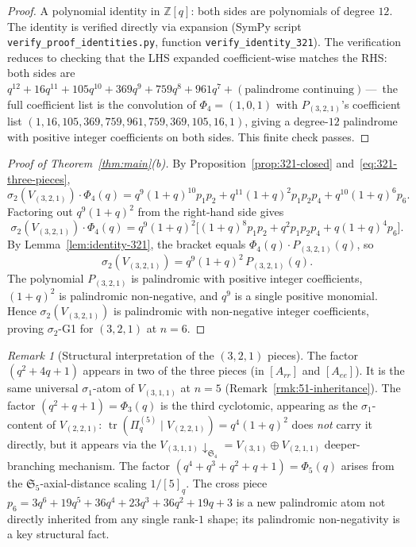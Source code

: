 \documentclass[11pt]{article}
\theoremstyle{plain}
\theoremstyle{definition}
\theoremstyle{remark}
\newtheorem{remark}[theorem]{Remark}
\newcommand{\Z}{\mathbb{Z}}
\newcommand{\Sym}{\mathfrak{S}}
\newcommand{\Pibs}{\Pi_q}
\newcommand{\trace}{\operatorname{tr}}
\begin{document}
\begin{proof}
A polynomial identity in $\Z[q]$: both sides are polynomials of degree $12$.
The identity is verified directly via expansion (SymPy script
\verb|verify_proof_identities.py|, function \verb|verify_identity_321|).
The verification reduces to checking that the LHS expanded coefficient-wise
matches the RHS: both sides are
$q^{12} + 16q^{11} + 105q^{10} + 369q^9 + 759q^8 + 961q^7 + (\text{palindrome continuing})$\,---\,
the full coefficient list is the convolution of $\Phi_4 = (1,0,1)$ with
$P_{(3,2,1)}$'s coefficient list $(1,16,105,369,759,961,759,369,105,16,1)$,
giving a degree-$12$ palindrome with positive integer coefficients on both
sides. This finite check passes.
\end{proof}

\begin{proof}[Proof of Theorem~\ref{thm:main}(b)]
By Proposition~\ref{prop:321-closed} and~\eqref{eq:321-three-pieces},
\[
  \sigma_2(V_{(3,2,1)}) \cdot \Phi_4(q)
    = q^9(1+q)^{10} p_1 p_2 + q^{11}(1+q)^2 p_1 p_2 p_4 + q^{10}(1+q)^6 p_6.
\]
Factoring out $q^9(1+q)^2$ from the right-hand side gives
\[
  \sigma_2(V_{(3,2,1)}) \cdot \Phi_4(q)
    = q^9(1+q)^2 \bigl[(1+q)^8 p_1 p_2 + q^2 p_1 p_2 p_4 + q(1+q)^4 p_6\bigr].
\]
By Lemma~\ref{lem:identity-321}, the bracket equals $\Phi_4(q) \cdot P_{(3,2,1)}(q)$,
so
\[
  \sigma_2(V_{(3,2,1)}) = q^9(1+q)^2\, P_{(3,2,1)}(q).
\]
The polynomial $P_{(3,2,1)}$ is palindromic with positive integer coefficients,
$(1+q)^2$ is palindromic non-negative, and $q^9$ is a single positive monomial.
Hence $\sigma_2(V_{(3,2,1)})$ is palindromic with non-negative integer
coefficients, proving $\sigma_2$-G1 for $(3,2,1)$ at $n=6$.
\end{proof}

\begin{remark}[Structural interpretation of the $(3,2,1)$ pieces]
\label{rmk:321-inheritance}
The factor $(q^2+4q+1)$ appears in two of the three pieces (in $[A_{rr}]$
and $[A_{ee}]$). It is the same universal $\sigma_1$-atom of $V_{(3,1,1)}$
at $n=5$ (Remark~\ref{rmk:51-inheritance}). The factor $(q^2+q+1) = \Phi_3(q)$
is the third cyclotomic, appearing as the $\sigma_1$-content of $V_{(2,2,1)}$:
$\trace(\Pibs^{(5)}\mid V_{(2,2,1)}) = q^4(1+q)^2$ does \emph{not} carry it
directly, but it appears via the $V_{(3,1,1)}\downarrow_{\Sym_4} = V_{(3,1)} \oplus V_{(2,1,1)}$
deeper-branching mechanism. The factor $(q^4+q^3+q^2+q+1) = \Phi_5(q)$
arises from the $\Sym_5$-axial-distance scaling $1/[5]_q$.
The cross piece $p_6 = 3q^6+19q^5+36q^4+23q^3+36q^2+19q+3$ is a new
palindromic atom not directly inherited from any single rank-$1$ shape;
its palindromic non-negativity is a key structural fact.
\end{remark}
\end{document}
